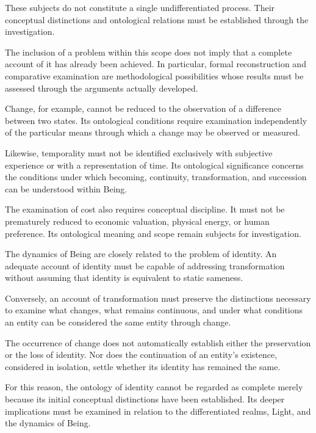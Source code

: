 These subjects do not constitute a single
undifferentiated process. Their conceptual
distinctions and ontological relations must be
established through the investigation.

The inclusion of a problem within this scope
does not imply that a complete account of it
has already been achieved. In particular,
formal reconstruction and comparative examination
are methodological possibilities whose results
must be assessed through the arguments actually
developed.

Change, for example, cannot be reduced to the
observation of a difference between two states.
Its ontological conditions require examination
independently of the particular means through
which a change may be observed or measured.

Likewise, temporality must not be identified
exclusively with subjective experience or with
a representation of time. Its ontological
significance concerns the conditions under
which becoming, continuity, transformation,
and succession can be understood within Being.

The examination of cost also requires conceptual
discipline. It must not be prematurely reduced
to economic valuation, physical energy, or human
preference. Its ontological meaning and scope
remain subjects for investigation.

The dynamics of Being are closely related to
the problem of identity. An adequate account
of identity must be capable of addressing
transformation without assuming that identity
is equivalent to static sameness.

Conversely, an account of transformation must
preserve the distinctions necessary to examine
what changes, what remains continuous, and
under what conditions an entity can be considered
the same entity through change.

The occurrence of change does not automatically
establish either the preservation or the loss
of identity. Nor does the continuation of an
entity's existence, considered in isolation,
settle whether its identity has remained the same.

For this reason, the ontology of identity cannot
be regarded as complete merely because its initial
conceptual distinctions have been established.
Its deeper implications must be examined in
relation to the differentiated realms, Light,
and the dynamics of Being.



